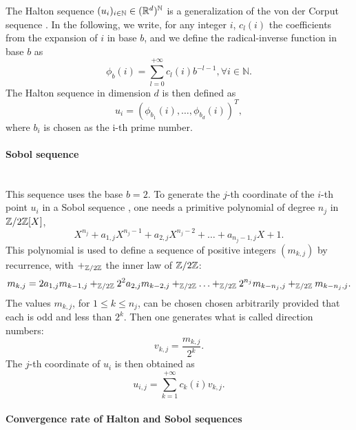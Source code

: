 The Halton sequence $(u_i)_{i\in\mathbb{N}} \in (\mathbb{R}^{d})^{\mathbb{N}}$ \citep{halton1964algorithm} is a generalization of the von der Corput sequence \citep{vdc1935}. In the following, we write, for any integer $i$, $c_l(i)$ the coefficients from the expansion of $i$ in base $b$, and we define the radical-inverse function in base $b$ as 
$$
\phi_b(i) = \displaystyle\sum\limits_{l = 0}^{+\infty} c_l(i)b^{{-}l-1},\forall i \in \mathbb{N}.
$$ 
The Halton sequence in dimension $d$ is then defined as
$$
u_i = (\phi_{b_1}(i),\hdots,\phi_{b_d}(i))^T,
$$
where $b_i$ is chosen as the i-th prime number.

\paragraph{Sobol sequence} \label{par:Sobol}\mbox{} \\

This sequence uses the base $b = 2$. To generate the $j$-th coordinate of the $i$-th point $u_i$ in a Sobol sequence \citep{sobol1967distribution}, one needs a primitive polynomial of degree $n_j$ in $\mathbb{Z}/2\mathbb{Z}[X]$,
$$
X^{n_j} + a_{1,j}X^{n_j - 1} + a_{2,j}X^{n_j - 2} + \hdots + a_{n_j-1,j}X + 1.
$$
{This polynomial is used to define} a sequence of positive integers $(m_{k,j})$ by recurrence, with $+_{\mathbb{Z}/2\mathbb{Z}}$ the inner law of $\mathbb{Z}/2\mathbb{Z}$:
$$
m_{k,j} = 2a_{1,j}m_{k-1,j}+_{\mathbb{Z}/2\mathbb{Z}} 2^2a_{2,j}m_{k-2,j} +_{\mathbb{Z}/2\mathbb{Z}} \hdots +_{\mathbb{Z}/2\mathbb{Z}} 2^{n_j}m_{k-n_j,j} +_{\mathbb{Z}/2\mathbb{Z}} m_{k-n_j,j}.
$$
The values $m_{k,j}$, {for $1\leq k \leq n_j$,} can be chosen chosen arbitrarily provided that each is odd and less than $2^k$. Then one {generates} what is called direction numbers:
$$v_{k,j} = \frac{m_{k,j}}{2^k}.$$
The $j$-th coordinate of $u_i$ is then obtained as
$$
u_{i,j} = \displaystyle\sum\limits_{k = 1}^{+\infty} c_k(i) v_{k,j}.
$$

\paragraph{Convergence rate of Halton and Sobol sequences} \label{par:convHaltonSobol}

